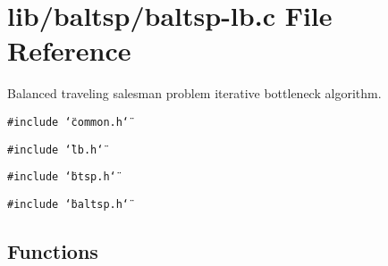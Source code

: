 \hypertarget{lib_2baltsp_2baltsp-lb_8c}{
\section{lib/baltsp/baltsp-lb.c File Reference}
\label{lib_2baltsp_2baltsp-lb_8c}
}
Balanced traveling salesman problem iterative bottleneck algorithm.  


{\tt \#include \char`\"{}common.h\char`\"{}}\par
{\tt \#include \char`\"{}lb.h\char`\"{}}\par
{\tt \#include \char`\"{}btsp.h\char`\"{}}\par
{\tt \#include \char`\"{}baltsp.h\char`\"{}}\par
\subsection*{Functions}

